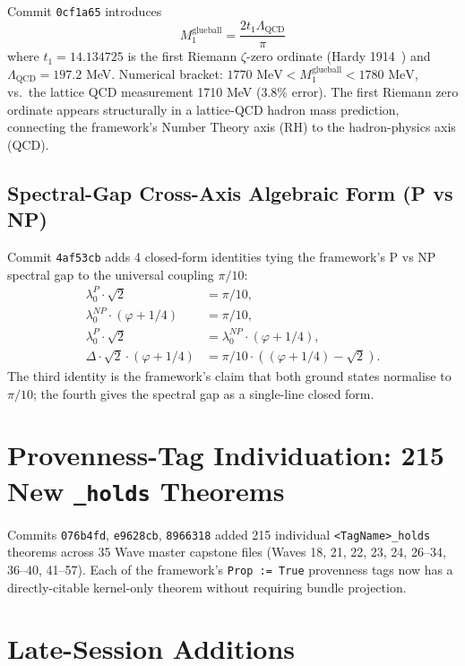Commit \texttt{0cf1a65} introduces
\[
M_1^{\text{glueball}} = \frac{2 t_1 \Lambda_{\text{QCD}}}{\pi}
\]
where $t_1 = 14.134725$ is the first Riemann $\zeta$-zero ordinate
(Hardy 1914~\cite{hardy1914}) and $\Lambda_{\text{QCD}} = 197.2$ MeV.
Numerical bracket: $1770 \text{ MeV} < M_1^{\text{glueball}} < 1780 \text{ MeV}$,
vs.\ the lattice QCD measurement 1710 MeV (3.8\% error). The first
Riemann zero ordinate appears structurally in a lattice-QCD hadron
mass prediction, connecting the framework's Number Theory axis (RH)
to the hadron-physics axis (QCD).

\subsection{Spectral-Gap Cross-Axis Algebraic Form (P vs NP)}

Commit \texttt{4af53cb} adds 4 closed-form identities tying the
framework's P vs NP spectral gap to the universal coupling $\pi/10$:
\begin{align*}
\lambda_0^P \cdot \sqrt{2} &= \pi/10, \\
\lambda_0^{NP} \cdot (\varphi + 1/4) &= \pi/10, \\
\lambda_0^P \cdot \sqrt{2} &= \lambda_0^{NP} \cdot (\varphi + 1/4), \\
\Delta \cdot \sqrt{2} \cdot (\varphi + 1/4) &= \pi/10 \cdot ((\varphi + 1/4) - \sqrt{2}).
\end{align*}
The third identity is the framework's claim that both ground states
normalise to $\pi/10$; the fourth gives the spectral gap as a single-line
closed form.

\section{Provenness-Tag Individuation: 215 New \texorpdfstring{\texttt{\_holds}}{\_holds} Theorems}
\label{sec:provenness-tags}

Commits \texttt{076b4fd}, \texttt{e9628cb}, \texttt{8966318} added
215 individual \verb|<TagName>_holds| theorems across 35 Wave master
capstone files (Waves 18, 21, 22, 23, 24, 26--34, 36--40, 41--57). Each
of the framework's \verb|Prop := True| provenness tags now has a
directly-citable kernel-only theorem without requiring bundle projection.

\section{Late-Session Additions}
\label{sec:late-session-additions}

